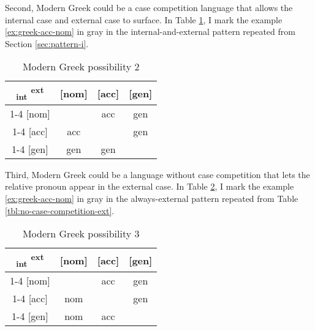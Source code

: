 Second, Modern Greek could be a case competition language that allows the internal case and external case to surface. In Table \ref{tbl:greek-poss2}, I mark the example \ref{ex:greek-acc-nom} in gray in the internal-and-external pattern repeated from Section \ref{sec:pattern-i}.

  \begin{table}[H]
    \center
    \caption{Modern Greek possibility 2}
    \begin{tabular}{c|c|c|c}
      \toprule
      \textsubscript{\ac{int}} \textsuperscript{\ac{ext}}
             & [\ac{nom}]
             & [\ac{acc}]
             & [\ac{gen}]
             \\ \cmidrule{1-4}
         [\ac{nom}]
             & \xcancel{\phantom{xx}}
             & \cellcolor{LG}\ac{acc}
             & \ac{gen}
             \\ \cmidrule{1-4}
         [\ac{acc}]
             & \ac{acc}
             & \xcancel{\phantom{xx}}
             & \ac{gen}
             \\ \cmidrule{1-4}
         [\ac{gen}]
             & \ac{gen}
             & \ac{gen}
             & \xcancel{\phantom{xx}}
             \\
       \bottomrule
    \end{tabular}
      \label{tbl:greek-poss2}
  \end{table}

Third, Modern Greek could be a language without case competition that lets the relative pronoun appear in the external case. In Table \ref{tbl:greek-poss3}, I mark the example \ref{ex:greek-acc-nom} in gray in the always-external pattern repeated from Table \ref{tbl:no-case-competition-ext}.

 \begin{table}[H]
   \center
   \caption{Modern Greek possibility 3}
   \begin{tabular}{c|c|c|c}
     \toprule
    \textsubscript{\ac{int}} \textsuperscript{\ac{ext}}
           & [\ac{nom}]
           & [\ac{acc}]
           & [\ac{gen}]
           \\ \cmidrule{1-4}
       [\ac{nom}]
           & \xcancel{\phantom{xx}}
           & \cellcolor{LG}\ac{acc}
           & \ac{gen}
           \\ \cmidrule{1-4}
       [\ac{acc}]
           & \ac{nom}
           & \xcancel{\phantom{xx}}
           & \ac{gen}
           \\ \cmidrule{1-4}
       [\ac{gen}]
           & \ac{nom}
           & \ac{acc}
           & \xcancel{\phantom{xx}}
           \\
     \bottomrule
   \end{tabular}
   \label{tbl:greek-poss3}
 \end{table}

